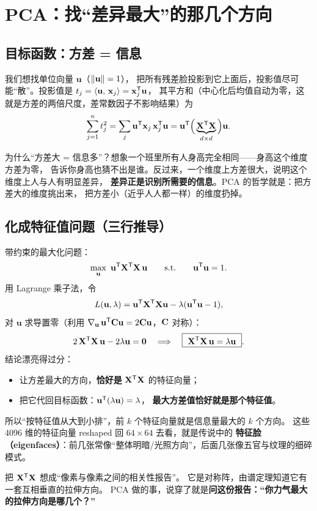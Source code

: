 \section{PCA：找“差异最大”的那几个方向}

\subsection{目标函数：方差 = 信息}

我们想找单位向量 $\mathbf{u}$（$\left\lVert \mathbf{u} \right\rVert=1$），
把所有残差脸投影到它上面后，投影值尽可能“散”。投影值是 $t_j=\left\langle \mathbf{u},\,\mathbf{x}_j \right\rangle=\mathbf{x}_j^{\mathsf{T}}\mathbf{u}$，
其平方和（中心化后均值自动为零，这就是方差的两倍尺度，差常数因子不影响结果）为
\[
\sum_{j=1}^{n} t_j^2
=\sum_j \mathbf{u}^{\mathsf{T}}\mathbf{x}_j\,\mathbf{x}_j^{\mathsf{T}}\mathbf{u}
=\mathbf{u}^{\mathsf{T}}\Big(\underbrace{\mathbf{X}^{\mathsf{T}}\mathbf{X}}_{d\times d}\Big)\mathbf{u}.
\]

\begin{intuition}
为什么“方差大 = 信息多”？想象一个班里所有人身高完全相同——身高这个维度方差为零，
告诉你身高也猜不出是谁。反过来，一个维度上方差很大，说明这个维度上人与人有明显差异，
\textbf{差异正是识别所需要的信息}。PCA 的哲学就是：把方差大的维度挑出来，
把方差小（近乎人人都一样）的维度扔掉。
\end{intuition}

\subsection{化成特征值问题（三行推导）}

带约束的最大化问题：
\[
\max_{\mathbf{u}}\ \mathbf{u}\mT\mat{X}\mT\mat{X}\,\mathbf{u}
\qquad\text{s.t.}\qquad \mathbf{u}\mT\mathbf{u}=1 .
\]
用 Lagrange 乘子法，令
\[
L(\mathbf{u},\lambda)=\mathbf{u}^{\mathsf{T}}\mathbf{X}^{\mathsf{T}}\mathbf{X}\mathbf{u}-\lambda(\mathbf{u}^{\mathsf{T}}\mathbf{u}-1),
\]
对 $\mathbf{u}$ 求导置零（利用 $\nabla_{\mathbf{u}}\,\mathbf{u}^{\mathsf{T}}\mathbf{C}\mathbf{u}=2\mathbf{C}\mathbf{u}$，$\mathbf{C}$ 对称）：
\[
2\,\mathbf{X}^{\mathsf{T}}\mathbf{X}\,\mathbf{u}-2\lambda\mathbf{u}=\mathbf{0}
\quad\Longrightarrow\quad
\boxed{\ \mathbf{X}^{\mathsf{T}}\mathbf{X}\,\mathbf{u}=\lambda\mathbf{u}\ }.
\]
结论漂亮得过分：
\begin{itemize}
  \item 让方差最大的方向，\textbf{恰好是} $\mathbf{X}^{\mathsf{T}}\mathbf{X}$ 的特征向量；
  \item 把它代回目标函数：$\mathbf{u}^{\mathsf{T}}(\lambda\mathbf{u})=\lambda$，
        \textbf{最大方差值恰好就是那个特征值}。
\end{itemize}
所以“按特征值从大到小排”，前 $k$ 个特征向量就是信息量最大的 $k$ 个方向。
这些 4096 维的特征向量 reshaped 回 $64\times 64$ 去看，就是传说中的
\textbf{特征脸（eigenfaces）}：前几张常像“整体明暗/光照方向”，后面几张像五官与纹理的细碎模式。

\begin{intuition}
把 $\mathbf{X}^{\mathsf{T}}\mathbf{X}$ 想成“像素与像素之间的相关性报告”。
它是对称阵，由谱定理知道它有一套互相垂直的拉伸方向。
PCA 做的事，说穿了就是\textbf{问这份报告：“你力气最大的拉伸方向是哪几个？”}
\end{intuition}
